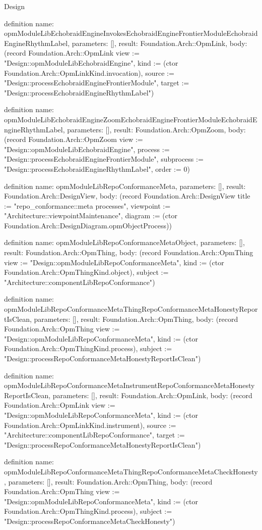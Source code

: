\begin{lexlean}{Design}
\begin{semanticmodule}
definition{
  name: opmModuleLibEchobraidEngineInvokesEchobraidEngineFrontierModuleEchobraidEngineRhythmLabel,
  parameters: [],
  result: Foundation.Arch::OpmLink,
  body: (record Foundation.Arch::OpmLink {view := "Design::opmModuleLibEchobraidEngine", kind := (ctor Foundation.Arch::OpmLinkKind.invocation), source := "Design::processEchobraidEngineFrontierModule", target := "Design::processEchobraidEngineRhythmLabel"})
}

definition{
  name: opmModuleLibEchobraidEngineZoomEchobraidEngineFrontierModuleEchobraidEngineRhythmLabel,
  parameters: [],
  result: Foundation.Arch::OpmZoom,
  body: (record Foundation.Arch::OpmZoom {view := "Design::opmModuleLibEchobraidEngine", process := "Design::processEchobraidEngineFrontierModule", subprocess := "Design::processEchobraidEngineRhythmLabel", order := 0})
}

definition{
  name: opmModuleLibRepoConformanceMeta,
  parameters: [],
  result: Foundation.Arch::DesignView,
  body: (record Foundation.Arch::DesignView {title := "repo_conformance::meta processes", viewpoint := "Architecture::viewpointMaintenance", diagram := (ctor Foundation.Arch::DesignDiagram.opmObjectProcess)})
}

definition{
  name: opmModuleLibRepoConformanceMetaObject,
  parameters: [],
  result: Foundation.Arch::OpmThing,
  body: (record Foundation.Arch::OpmThing {view := "Design::opmModuleLibRepoConformanceMeta", kind := (ctor Foundation.Arch::OpmThingKind.object), subject := "Architecture::componentLibRepoConformance"})
}

definition{
  name: opmModuleLibRepoConformanceMetaThingRepoConformanceMetaHonestyReportIsClean,
  parameters: [],
  result: Foundation.Arch::OpmThing,
  body: (record Foundation.Arch::OpmThing {view := "Design::opmModuleLibRepoConformanceMeta", kind := (ctor Foundation.Arch::OpmThingKind.process), subject := "Design::processRepoConformanceMetaHonestyReportIsClean"})
}

definition{
  name: opmModuleLibRepoConformanceMetaInstrumentRepoConformanceMetaHonestyReportIsClean,
  parameters: [],
  result: Foundation.Arch::OpmLink,
  body: (record Foundation.Arch::OpmLink {view := "Design::opmModuleLibRepoConformanceMeta", kind := (ctor Foundation.Arch::OpmLinkKind.instrument), source := "Architecture::componentLibRepoConformance", target := "Design::processRepoConformanceMetaHonestyReportIsClean"})
}

definition{
  name: opmModuleLibRepoConformanceMetaThingRepoConformanceMetaCheckHonesty,
  parameters: [],
  result: Foundation.Arch::OpmThing,
  body: (record Foundation.Arch::OpmThing {view := "Design::opmModuleLibRepoConformanceMeta", kind := (ctor Foundation.Arch::OpmThingKind.process), subject := "Design::processRepoConformanceMetaCheckHonesty"})
}


\end{semanticmodule}
\end{lexlean}
